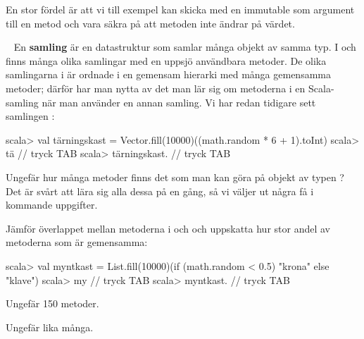 \SubtaskSolved   En stor fördel är att vi till exempel kan skicka med en immutable som argument till en metod och vara säkra på att metoden inte ändrar på värdet.


\QUESTEND









\QUESTBEGIN

\Task  \what~  En \textbf{samling}  är en datastruktur som samlar många objekt av samma typ. I  och  finns många olika samlingar med en uppsjö användbara metoder. De olika samlingarna i  är ordnade i en gemensam hierarki med många gemensamma metoder; därför har man nytta av det man lär sig om metoderna i en Scala-samling när man använder en annan samling. Vi har redan tidigare sett samlingen :

\begin{REPL}
scala> val tärningskast = Vector.fill(10000)((math.random * 6 + 1).toInt)
scala> tä   // tryck TAB
scala> tärningskast.  // tryck TAB
\end{REPL}

\Subtask Ungefär hur många metoder finns det som man kan göra på objekt av typen ? Det är svårt att lära sig alla dessa på en gång, så vi väljer ut några få i kommande uppgifter.

\Subtask Jämför överlappet mellan metoderna i  och  och uppskatta hur stor andel av metoderna som är gemensamma:
\begin{REPL}
scala> val myntkast =
         List.fill(10000)(if (math.random < 0.5) "krona" else "klave")
scala> my   // tryck TAB
scala> myntkast.  // tryck TAB
\end{REPL}

\SOLUTION


\TaskSolved \what
 

\SubtaskSolved   Ungefär 150 metoder.

\SubtaskSolved   Ungefär lika många.


\QUESTEND









\QUESTBEGIN

